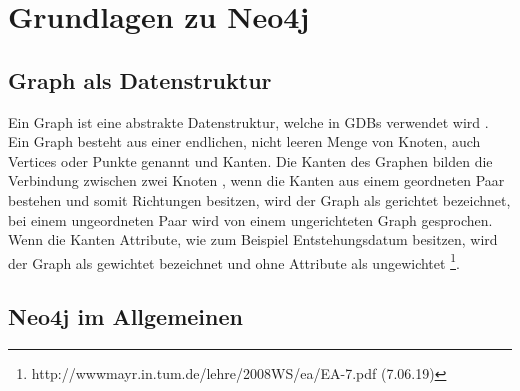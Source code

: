 
\chapter{Grundlagen zu Neo4j} %

\label{Kaptiel 2} %

\section{Graph als Datenstruktur}

Ein Graph ist eine abstrakte Datenstruktur, welche in GDBs verwendet wird \parencite{vicknair2010comparison}. Ein Graph besteht aus einer endlichen, nicht leeren Menge von Knoten, auch Vertices oder Punkte genannt und Kanten. Die Kanten des Graphen bilden die Verbindung zwischen zwei Knoten , wenn die Kanten aus einem geordneten Paar bestehen und somit Richtungen besitzen, wird der Graph als gerichtet bezeichnet, bei einem ungeordneten Paar wird von einem ungerichteten Graph gesprochen\parencite{bondy1976graph}. Wenn die Kanten Attribute, wie zum Beispiel Entstehungsdatum besitzen, wird der Graph als gewichtet bezeichnet und ohne Attribute als ungewichtet  \footnote{ http://wwwmayr.in.tum.de/lehre/2008WS/ea/EA-7.pdf (7.06.19)}. 

\section{Neo4j im Allgemeinen}

